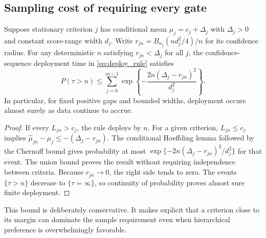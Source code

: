 \subsection{Sampling cost of requiring every gate}

\begin{proposition}
\label{prop:delay_bound}
Suppose stationary criterion $j$ has conditional mean
$\mu_j=c_j+\Delta_j$ with $\Delta_j>0$ and constant score-range width
$d_j$. Write $r_{jn}=B_{\alpha_j}(nd_j^2/4)/n$ for its confidence
radius. For any deterministic $n$ satisfying $r_{jn}<\Delta_j$ for all
$j$, the confidence-sequence deployment time in
\eqref{eq:deploy_rule} satisfies
\[
 P(\tau>n)\leq\sum_{j=0}^{m-1}
       \exp\!\left\{-\frac{2n(\Delta_j-r_{jn})^2}{d_j^2}\right\}.
\]
In particular, for fixed positive gaps and bounded widths, deployment
occurs almost surely as data continue to accrue.
\end{proposition}
\begin{proof}
If every $L_{jn}>c_j$, the rule deploys by $n$. For a given criterion,
$L_{jn}\leq c_j$ implies
$\widehat\mu_{jn}-\mu_j\leq-(\Delta_j-r_{jn})$.
The conditional Hoeffding lemma followed by the Chernoff bound gives
probability at most
$\exp\{-2n(\Delta_j-r_{jn})^2/d_j^2\}$ for that event. The union
bound proves the result without requiring independence between criteria.
Because $r_{jn}\to0$, the right side tends to zero. The events
$\{\tau>n\}$ decrease to $\{\tau=\infty\}$, so continuity of
probability proves almost sure finite deployment.
\end{proof}

This bound is deliberately conservative. It makes explicit that a
criterion close to its margin can dominate the sample requirement even
when hierarchical preference is overwhelmingly favorable.

